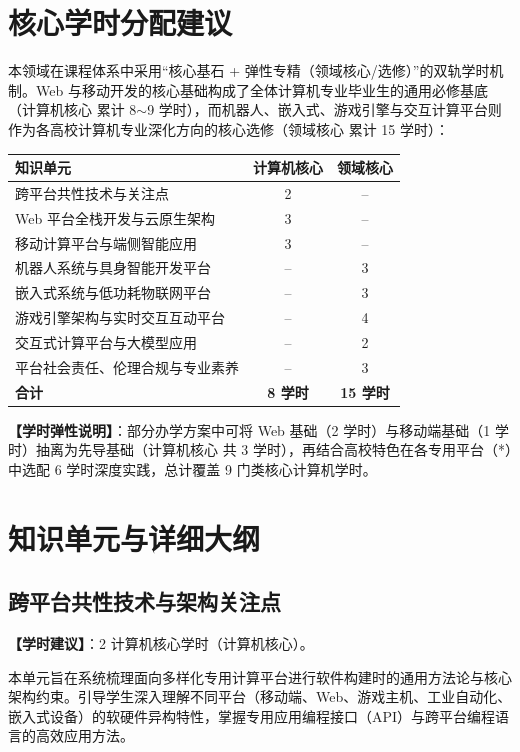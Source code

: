 \section{核心学时分配建议}

本领域在课程体系中采用“核心基石 + 弹性专精（领域核心/选修）”的双轨学时机制。Web 与移动开发的核心基础构成了全体计算机专业毕业生的通用必修基底（计算机核心 累计 8$\sim$9 学时），而机器人、嵌入式、游戏引擎与交互计算平台则作为各高校计算机专业深化方向的核心选修（领域核心 累计 15 学时）：

\begin{table}[H]
\centering
\setlength{\tabcolsep}{3.5pt}\fontsize{8pt}{9.6pt}\selectfont\begin{tabularx}{\columnwidth}{Y c c}
\toprule
\textbf{知识单元} & \textbf{计算机核心} & \textbf{领域核心} \\
\midrule
跨平台共性技术与关注点 & 2 & -- \\
Web 平台全栈开发与云原生架构 & 3 & -- \\
移动计算平台与端侧智能应用 & 3 & -- \\
机器人系统与具身智能开发平台 & -- & 3 \\
嵌入式系统与低功耗物联网平台 & -- & 3 \\
游戏引擎架构与实时交互互动平台 & -- & 4 \\
交互式计算平台与大模型应用 & -- & 2 \\
平台社会责任、伦理合规与专业素养 & -- & 3 \\
\midrule
\textbf{合计} & \textbf{8 学时} & \textbf{15 学时} \\
\bottomrule
\end{tabularx}
\end{table}

\noindent\textbf{【学时弹性说明】}：部分办学方案中可将 Web 基础（2 学时）与移动端基础（1 学时）抽离为先导基础（计算机核心 共 3 学时），再结合高校特色在各专用平台（*）中选配 6 学时深度实践，总计覆盖 9 门类核心计算机学时。

\section{知识单元与详细大纲}

\subsection{跨平台共性技术与架构关注点}
\textbf{【学时建议】}：2 计算机核心学时（计算机核心）。

本单元旨在系统梳理面向多样化专用计算平台进行软件构建时的通用方法论与核心架构约束。引导学生深入理解不同平台（移动端、Web、游戏主机、工业自动化、嵌入式设备）的软硬件异构特性，掌握专用应用编程接口（API）与跨平台编程语言的高效应用方法。

